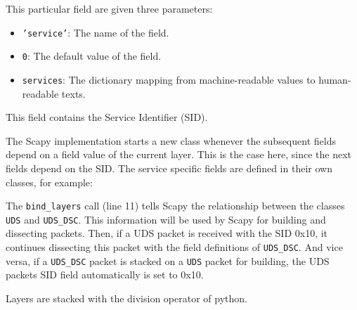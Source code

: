 This particular field are given three parameters:

\begin{itemize}
    \item \texttt{'service'}: The name of the field.
    \item \texttt{0}: The default value of the field.
    \item \texttt{services}: The dictionary mapping from machine-readable values to human-readable texts.
\end{itemize}

This field contains the Service Identifier (SID).

The Scapy implementation starts a new class whenever the subsequent fields depend on a field value of the current layer. This is the case here, since the next fields depend on the SID. The service specific fields are defined in their own classes, for example:


The \texttt{bind_layers} call (line 11) tells Scapy the relationship between the classes \texttt{UDS} and \texttt{UDS_DSC}. This information will be used by Scapy for building and dissecting packets.
Then, if a UDS packet is received with the SID 0x10, it continues dissecting this packet with the field definitions of \texttt{UDS_DSC}. And vice versa, if a \texttt{UDS_DSC} packet is stacked on a \texttt{UDS} packet for building, the UDS packets SID field automatically is set to 0x10.

Layers are stacked with the division operator of python.


